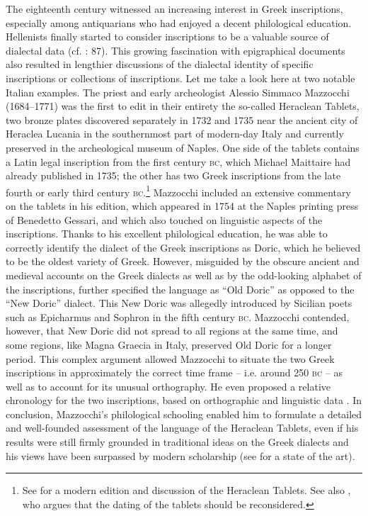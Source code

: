 The eighteenth century witnessed an increasing interest in Greek inscriptions, especially among antiquarians who had enjoyed a decent philological education. Hellenists finally started to consider inscriptions to be a valuable source of dialectal data (cf. \citealt{Walch1772}: 87). This growing fascination with epigraphical documents also resulted in lengthier discussions of the dialectal identity of specific inscriptions or collections of inscriptions. Let me take a look here at two notable Italian examples. The priest and early archeologist Alessio Simmaco Mazzocchi (1684–1771) was the first to edit in their entirety the so-called Heraclean Tablets, two bronze plates discovered separately in 1732 and 1735 near the ancient city of Heraclea Lucania in the southernmost part of modern-day Italy and currently preserved in the archeological museum of Naples. One side of the tablets contains a Latin legal inscription from the first century \textsc{bc}, which Michael Maittaire had already published in 1735; the other has two Greek inscriptions from the late fourth or early third century \textsc{bc}.\footnote{See \citet{Uguzzoni1968} for a modern edition and discussion of the Heraclean Tablets. See also \citet{Weiss2016}, who argues that the dating of the tablets should be reconsidered.} Mazzocchi included an extensive commentary on the tablets in his edition, which appeared in 1754 at the Naples printing press of Benedetto Gessari, and which also touched on linguistic aspects of the inscriptions. Thanks to his excellent philological education, he was able to correctly identify the dialect of the Greek inscriptions as Doric, which he believed to be the oldest variety of Greek. However, misguided by the obscure ancient and medieval accounts on the Greek dialects as well as by the odd-looking alphabet of the inscriptions, \citet[118--120]{Mazzocchi1754} further specified the language as “Old Doric” as opposed to the “New Doric” dialect. This New Doric was allegedly introduced by Sicilian poets such as Epicharmus and Sophron in the fifth century \textsc{bc}. Mazzocchi contended, however, that New Doric did not spread to all regions at the same time, and some regions, like Magna Graecia in Italy, preserved Old Doric for a longer period. This complex argument allowed Mazzocchi to situate the two Greek inscriptions in approximately the correct time frame – i.e. around 250 \textsc{bc} – as well as to account for its unusual orthography. He even proposed a relative chronology for the two inscriptions, based on orthographic and linguistic data \citep[135]{Mazzocchi1754}. In conclusion, Mazzocchi’s philological schooling enabled him to formulate a detailed and well-founded assessment of the language of the Heraclean Tablets, even if his results were still firmly grounded in traditional ideas on the Greek dialects and his views have been surpassed by modern scholarship (see \citealt{Weiss2016} for a state of the art).


